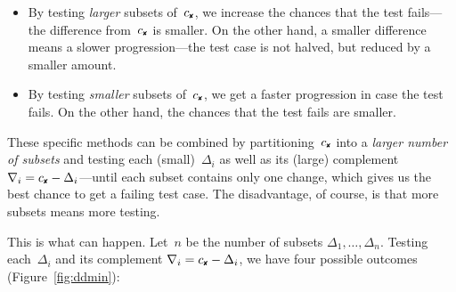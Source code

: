 \documentclass{acm_proc_article-sp}
\newcommand{\FAIL}{\text{\ding{56}}\xspace}
\newcommand{\cfail}{{c_{\scriptscriptstyle \FAIL}}}
\theoremstyle{plain}
\begin{document}
\begin{itemize}
\item By testing \emph{larger} subsets of~$\cfail$, we increase the
  chances that the test fails---the difference from~$\cfail$ is
  smaller.  On the other hand, a smaller difference means a slower
  progression---the test case is not halved, but reduced by a smaller
  amount.
\item By testing \emph{smaller} subsets of~$\cfail$, we get a faster
  progression in case the test fails.  On the other hand, the chances
  that the test fails are smaller.
\end{itemize}

\noindent
These specific methods can be combined by partitioning~$\cfail$ into a
\emph{larger number of subsets} and testing each (small)~$\Delta_i$ as well
as its (large) complement~$\nabla_i = \cfail - \Delta_i$---until each subset contains
only one change, which gives us the best chance to get a failing test
case.  The disadvantage, of course, is that more subsets means more
testing.

This is what can happen.  Let~$n$ be the number of subsets $\Delta_1, \ldots,
\Delta_n$.  Testing each~$\Delta_i$ and its complement $\nabla_i = \cfail - \Delta_i$, we
have four possible outcomes (Figure~\ref{fig:ddmin}):
\end{document}
